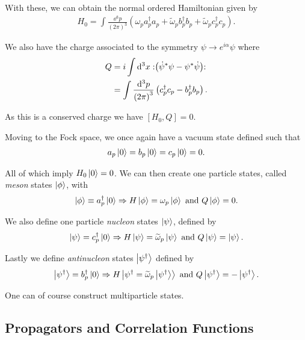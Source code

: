 With these, we can obtain the normal ordered Hamiltonian given by
\begin{align}
    H_0 = \int \frac{\dd{^3p}}{\left( 2\pi\right)^3} \left( \omega_p a^{\dag}_p a_p + \widetilde{\omega}_p b^{\dag}_p b_p + \widetilde{\omega}_{p} c^{\dag}_p c_p \right) 
.\end{align}

We also have the charge associated to the symmetry $\psi \to e^{i\alpha} \psi$ where
\begin{align}
    Q &= i \int \dd{^3x} :\mathrel{\left( \dot{\psi}^{*} \psi - \psi^{*} \dot{\psi} \right)}:\\
    &=  \int \frac{\dd{^3p}}{\left( 2\pi\right)^3} \left( c^{\dag}_p c_p - b^{\dag}_p b_p \right)
.\end{align}

As this is a conserved charge we have $\left[ H_0, Q \right] = 0$.

Moving to the Fock space, we once again have a vacuum state defined such that
\begin{align}
    a_p \ket{0} = b_p \ket{0} = c_p \ket{0} = 0
.\end{align}

All of which imply $H_0 \ket{0} = 0$. We can then create one particle states, called \textit{meson} states $\ket{\phi}$, with
\begin{align}
    \ket{\phi} \equiv a^{\dag}_p \ket{0} \Rightarrow H \ket{\phi} = \omega_{p} \ket{\phi} \text{~and~} Q \ket{\phi} = 0
.\end{align}

We also define one particle \textit{nucleon} states $\ket{\psi}$, defined by
\begin{align}
    \ket{\psi} = c^{\dag}_p \ket{0} \Rightarrow H \ket{\psi} = \widetilde{\omega}_p \ket{\psi} \text{~and~} Q \ket{\psi} = \ket{\psi}
.\end{align}

Lastly we define \textit{antinucleon} states $\ket{\psi^{\dag}}$ defined by
\begin{align}
    \ket{\psi^{\dag}} = b^{\dag}_p \ket{0} \Rightarrow H \ket{\psi^{\dag} = \widetilde{\omega}_p \ket{\psi^{\dag}}} \text{~and~}Q \ket{\psi^{\dag}} = - \ket{\psi^{\dag}}
.\end{align}

One can of course construct multiparticle states.

\subsection{Propagators and Correlation Functions}


